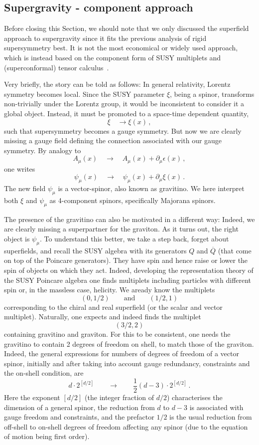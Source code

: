 \documentclass[12pt]{article}
\newcommand{\be}{\begin{equation}}
\newcommand{\ee}{\end{equation}}
\newcommand{\ol}{\overline}
\numberwithin{equation}{section}
\begin{document}
\subsection{Supergravity - component approach}

Before closing this Section, we should note that we only discussed the superfield approach to supergravity since it fits the previous analysis of rigid supersymmetry best. It is not the most economical or widely used approach, which is instead based on the component form of SUSY multiplets and (superconformal) tensor calculus~\cite{Freedman:2012zz}.

Very briefly, the story can be told as follows: In general relativity, Lorentz symmetry becomes local. Since the SUSY parameter $\xi$, being a spinor, transforms non-trivially under the Lorentz group, it would be inconsistent to consider it a global object. Instead, it must be promoted to a space-time dependent quantity,
\be
\xi\quad\to \xi(x)\,,
\ee
such that supersymmetry becomes a gauge symmetry. But now we are clearly missing a gauge field defining the connection associated with our gauge symmetry. By analogy to
\be
A_\mu(x)\quad\to\quad A_\mu(x)+\partial_\mu\epsilon(x)\,,
\ee
one writes
\be
\psi_\mu(x)\quad\to\quad \psi_\mu(x)+\partial_\mu\xi(x)\,.
\ee
The new field $\psi_\mu$ is a vector-spinor, also known as gravitino. We here interpret both $\xi$ and $\psi_\mu$ as 4-component spinors, specifically Majorana spinors. 

The presence of the gravitino can also be motivated in a different way: Indeed, we are clearly missing a superpartner for the graviton. As it turns out, the right object is $\psi_\mu$. To understand this better, we take a step back, forget about superfields, and recall the SUSY algebra with its generators $Q$ and $\ol{Q}$ (that come on top of the Poincare generators). They have spin and hence raise or lower the spin of objects on which they act. Indeed, developing the representation theory of the SUSY Poincare algebra one finds multiplets including particles with different spin or, in the massless case, helicity. We aready know the multiplets
\be
(0,1/2)\qquad\mbox{and}\qquad (1/2,1)
\ee
corresponding to the chiral and real superfield (or the scalar and vector multiplet). Naturally, one expects and indeed finds the multiplet
\be
(3/2,2)
\ee
containing gravitino and graviton. For this to be consistent, one needs the gravitino to contain 2 degrees of freedom on shell, to match those of the graviton. Indeed, the general expressions for numbers of degrees of freedom of a vector spinor, initially and after taking into account gauge redundancy, constraints and the on-shell condition, are
\be
d\cdot 2^{[d/2]}\qquad \to\qquad \frac{1}{2}(d-3)\cdot 2^{[d/2]}\,.
\ee
Here the exponent $[d/2]$ (the integer fraction of $d/2$) characterises the dimension of a general spinor, the reduction from $d$ to $d-3$ is associated with gauge freedom and constraints, and the prefactor $1/2$ is the usual reduction from off-shell to on-shell degrees of freedom affecting any spinor (due to the equation of motion being first order). 
\end{document}
